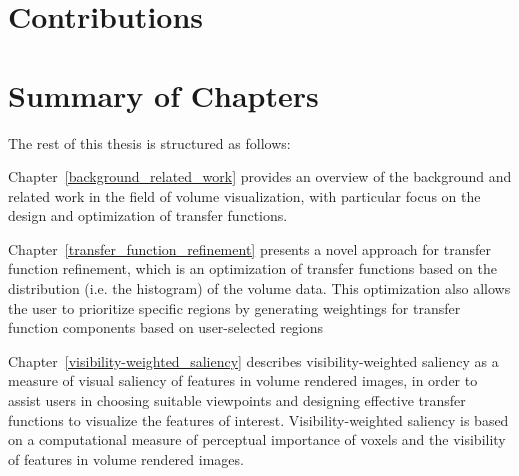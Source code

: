 %
%


\section{Contributions}

\section{Summary of Chapters}
The rest of this thesis is structured as follows:

Chapter~\ref{background_related_work}
provides an overview of the background and related work in the field of volume visualization, with particular focus on the design and optimization of transfer functions.

Chapter~\ref{transfer_function_refinement}
presents a novel approach for transfer function refinement, which is an optimization of transfer functions based on the distribution (i.e. the histogram) of the volume data. This optimization also allows the user to prioritize specific regions by generating weightings for transfer function components based on user-selected regions

Chapter~\ref{visibility-weighted_saliency}
describes visibility-weighted saliency as a measure of visual saliency of features in volume rendered images, in order to assist users in choosing suitable viewpoints and designing effective transfer functions to visualize the features of interest. Visibility-weighted saliency is based on a computational measure of perceptual importance of voxels and the visibility of features in volume rendered images.

